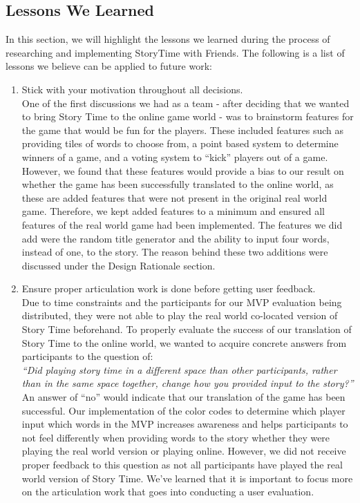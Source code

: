 \documentclass{sigchi}
\begin{document}
\subsection{Lessons We Learned}
In this section, we will highlight the lessons we learned during the process of researching and implementing StoryTime with Friends. The following is a list of lessons we believe can be applied to future work:
\begin{enumerate}
\item Stick with your motivation throughout all decisions.\\

One of the first discussions we had as a team - after deciding that we wanted to bring Story Time to the online game world - was to brainstorm features for the game that would be fun for the players. These included features such as providing tiles of words to choose from, a point based system to determine winners of a game, and a voting system to ``kick'' players out of a game. However, we found that these features would provide a bias to our result on whether the game has been successfully translated to the online world, as these are added features that were not present in the original real world game. Therefore, we kept added features to a minimum and ensured all features of the real world game had been implemented. The features we did add were the random title generator and the ability to input four words, instead of one, to the story. The reason behind these two additions were discussed under the Design Rationale section.

\item Ensure proper articulation work is done before getting user feedback.\\

Due to time constraints and the participants for our MVP evaluation being distributed, they were not able to play the real world co-located version of Story Time beforehand. To properly evaluate the success of our translation of Story Time to the online world, we wanted to acquire concrete answers from participants to the question of:\\

\textit{``Did playing story time in a different space than other participants, rather than in the same space together, change how you provided input to the story?''}\\

An answer of ``no'' would indicate that our translation of the game has been successful. Our implementation of the color codes to determine which player input which words in the MVP increases awareness and helps participants to not feel differently when providing words to the story whether they were playing the real world version or playing online. However, we did not receive proper feedback to this question as not all participants have played the real world version of Story Time. We've learned that it is important to focus more on the articulation work that goes into conducting a user evaluation.



\end{enumerate}
\end{document}
